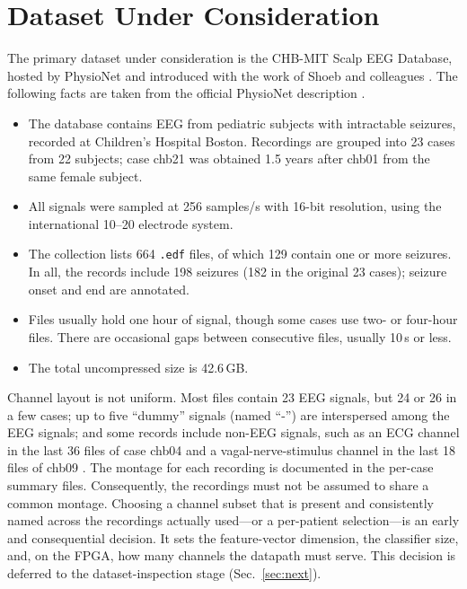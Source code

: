 \documentclass[10pt,twocolumn,letterpaper]{article}
\begin{document}
\section{Dataset Under Consideration}
\label{sec:dataset}

The primary dataset under consideration is the CHB-MIT Scalp EEG
Database, hosted by PhysioNet \cite{guttag2010chbmit,goldberger2000physionet}
and introduced with the work of Shoeb and colleagues
\cite{shoeb2009thesis,shoeb2010icml}. The following facts are taken from
the official PhysioNet description \cite{guttag2010chbmit}.
\begin{itemize}
  \item The database contains EEG from pediatric subjects with
    intractable seizures, recorded at Children's Hospital Boston.
    Recordings are grouped into 23 cases from 22 subjects; case chb21
    was obtained 1.5 years after chb01 from the same female subject.
  \item All signals were sampled at 256 samples/s with 16-bit
    resolution, using the international 10--20 electrode system.
  \item The collection lists 664 \texttt{.edf} files, of which 129
    contain one or more seizures. In all, the records include 198
    seizures (182 in the original 23 cases); seizure onset and end are
    annotated.
  \item Files usually hold one hour of signal, though some cases use
    two- or four-hour files. There are occasional gaps between
    consecutive files, usually 10\,s or less.
  \item The total uncompressed size is 42.6\,GB.
\end{itemize}

Channel layout is not uniform. Most files contain 23 EEG signals, but 24
or 26 in a few cases; up to five ``dummy'' signals (named ``-'') are
interspersed among the EEG signals; and some records include non-EEG
signals, such as an ECG channel in the last 36 files of case chb04 and a
vagal-nerve-stimulus channel in the last 18 files of chb09
\cite{guttag2010chbmit}. The montage for each recording is documented in
the per-case summary files. Consequently, the recordings must not be
assumed to share a common montage. Choosing a channel subset that is
present and consistently named across the recordings actually used---or
a per-patient selection---is an early and consequential decision. It
sets the feature-vector dimension, the classifier size, and, on the
FPGA, how many channels the datapath must serve. This decision is
deferred to the dataset-inspection stage (Sec.~\ref{sec:next}).
\end{document}
